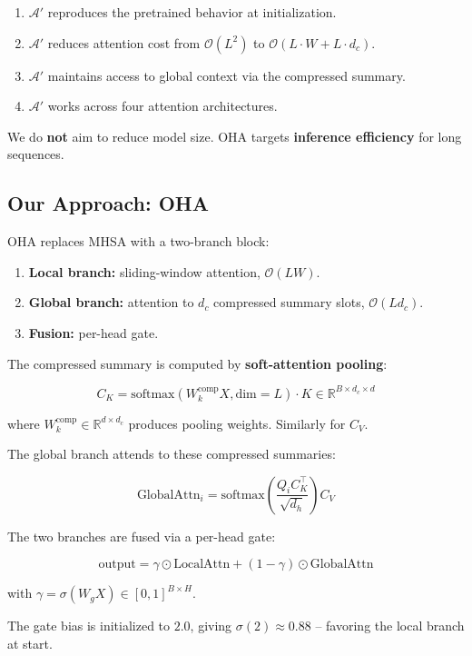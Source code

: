 \begin{enumerate}
\item $\mathcal{A}'$ reproduces the pretrained behavior at initialization.
\item $\mathcal{A}'$ reduces attention cost from $\mathcal{O}(L^2)$ to
  $\mathcal{O}(L \cdot W + L \cdot d_c)$.
\item $\mathcal{A}'$ maintains access to global context via the compressed
  summary.
\item $\mathcal{A}'$ works across four attention architectures.

\end{enumerate}
We do \textbf{not} aim to reduce model size. OHA targets \textbf{inference efficiency} 
for long sequences.

\subsection{Our Approach: OHA}

OHA replaces MHSA with a two-branch block:

\begin{enumerate}
\item \textbf{Local branch:} sliding-window attention, $\mathcal{O}(L W)$.
\item \textbf{Global branch:} attention to $d_c$ compressed summary slots,
  $\mathcal{O}(L d_c)$.
\item \textbf{Fusion:} per-head gate.

\end{enumerate}
The compressed summary is computed by \textbf{soft-attention pooling}:

\[
C_K = \text{softmax}(W_k^\text{comp} X, \text{dim}=L) \cdot K \in \mathbb{R}^{B \times d_c \times d}
\]

where $W_k^\text{comp} \in \mathbb{R}^{d \times d_c}$ produces pooling weights. 
Similarly for $C_V$.

The global branch attends to these compressed summaries:

\[
\text{GlobalAttn}_i = \text{softmax}\!\left(\frac{Q_i C_K^\top}{\sqrt{d_h}}\right) C_V
\]

The two branches are fused via a per-head gate:

\[
\text{output} = \gamma \odot \text{LocalAttn} + (1 - \gamma) \odot \text{GlobalAttn}
\]

with $\gamma = \sigma(W_g X) \in [0, 1]^{B \times H}$.

The gate bias is initialized to $2.0$, giving $\sigma(2) \approx 0.88$ -- 
favoring the local branch at start.

